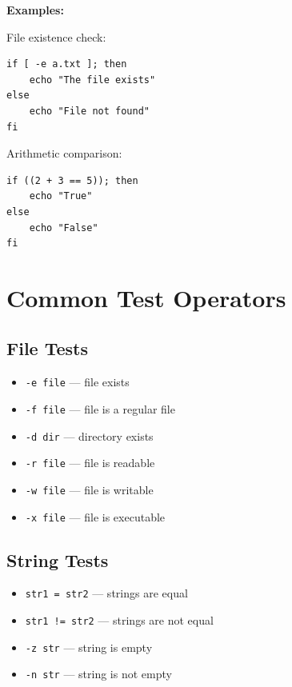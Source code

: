 \textbf{Examples:}

File existence check:
\begin{lstlisting}[language=Terminal]
if [ -e a.txt ]; then
    echo "The file exists"
else
    echo "File not found"
fi
\end{lstlisting}

Arithmetic comparison:
\begin{lstlisting}[language=Terminal]
if ((2 + 3 == 5)); then
    echo "True"
else
    echo "False"
fi
\end{lstlisting}

\section{Common Test Operators}

\subsection{File Tests}
\begin{itemize}
    \item \texttt{-e file} --- file exists
    \item \texttt{-f file} --- file is a regular file
    \item \texttt{-d dir} --- directory exists
    \item \texttt{-r file} --- file is readable
    \item \texttt{-w file} --- file is writable
    \item \texttt{-x file} --- file is executable
\end{itemize}

\subsection{String Tests}
\begin{itemize}
    \item \texttt{str1 = str2} --- strings are equal
    \item \texttt{str1 != str2} --- strings are not equal
    \item \texttt{-z str} --- string is empty
    \item \texttt{-n str} --- string is not empty
\end{itemize}

